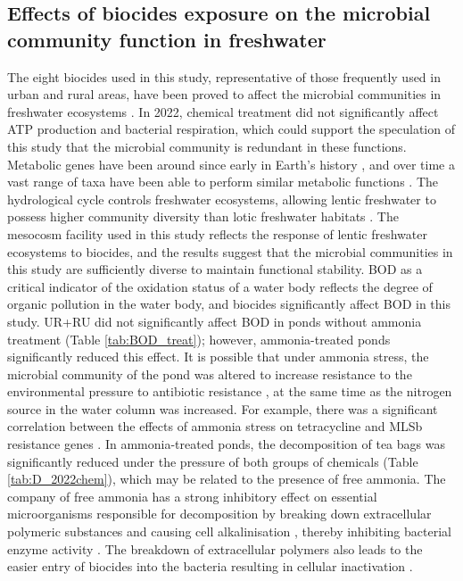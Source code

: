 \documentclass[11pt, a4paper]{article}
\begin{document}
\begin{spacing}{1.5}
\subsection{Effects of biocides exposure on the microbial community function in freshwater}

The eight biocides used in this study, representative of those frequently used in urban and rural areas, have been proved to affect the microbial communities in freshwater ecosystems \citep{andreozzi2004antibiotics,barbosa2021resistance,CARABIASMARTINEZ2000471,ernst1991toxicity,keighleyenvironmental,pascault2014high,zhou2020adverse}. In 2022, chemical treatment did not significantly affect ATP production and bacterial respiration, which could support the speculation of this study that the microbial community is redundant in these functions. Metabolic genes have been around since early in Earth's history \citep{david2011rapid}, and over time a vast range of taxa have been able to perform similar metabolic functions \citep{louca2016decoupling}. The hydrological cycle controls freshwater ecosystems, allowing lentic freshwater to possess higher community diversity than lotic freshwater habitats \citep{kuehn2016lentic,roland2010relationships}. The mesocosm facility used in this study reflects the response of lentic freshwater ecosystems to biocides, and the results suggest that the microbial communities in this study are sufficiently diverse to maintain functional stability. BOD as a critical indicator of the oxidation status of a water body reflects the degree of organic pollution in the water body, and biocides significantly affect BOD in this study. UR+RU did not significantly affect BOD in ponds without ammonia treatment (Table \ref{tab:BOD_treat}); however, ammonia-treated ponds significantly reduced this effect. It is possible that under ammonia stress, the microbial community of the pond was altered to increase resistance to the environmental pressure to antibiotic resistance \citep{poole2012stress}, at the same time as the nitrogen source in the water column was increased. For example, there was a significant correlation between the effects of ammonia stress on tetracycline and MLSb resistance genes \citep{zhang2020ammonia}. In ammonia-treated ponds, the decomposition of tea bags was significantly reduced under the pressure of both groups of chemicals (Table \ref{tab:D_2022chem}), which may be related to the presence of free ammonia. The company of free ammonia has a strong inhibitory effect on essential microorganisms responsible for decomposition by breaking down extracellular polymeric substances and causing cell alkalinisation \citep{ferreira2007effect, zhang2018free}, thereby inhibiting bacterial enzyme activity \citep{muller2006ammonium}. The breakdown of extracellular polymers also leads to the easier entry of biocides into the bacteria resulting in cellular inactivation \citep{liu2019roles}.


\end{spacing}
\end{document}
